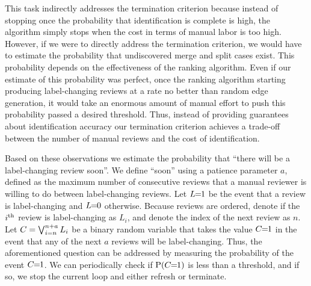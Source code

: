 This task indirectly addresses the termination criterion because instead of stopping once the probability that
  identification is complete is high, the algorithm simply stops when the cost in terms of manual labor is too
  high.
However, if we were to directly address the termination criterion, we would have to estimate the probability that
  undiscovered merge and split cases exist.
This probability depends on the effectiveness of the ranking algorithm.
Even if our estimate of this probability was perfect, once the ranking algorithm starting producing label-changing
  reviews at a rate no better than random edge generation, it would take an enormous amount of manual effort to
  push this probability passed a desired threshold.
Thus, instead of providing guarantees about identification accuracy our termination criterion achieves a
  trade-off between the number of manual reviews and the cost of identification.

Based on these observations we estimate the probability that ``there will be a label-changing review soon''.
We define ``soon'' using a patience parameter $a$, defined as the maximum number of consecutive reviews that a
  manual reviewer is willing to do between label-changing reviews.
Let $L\mkern-6mu=\mkern-6mu1$ be the event that a review is label-changing and $L\mkern-6mu=\mkern-6mu0$ otherwise.
Because reviews are ordered, denote if the $i^{\textrm{th}}$ review is label-changing as $L_i$, and denote the index of the
  next review as $n$.
Let  %
$C = \bigvee_{i=n}^{n+a} L_i$
%
be a binary random variable that takes the value $C\mkern-6mu=\mkern-6mu1$ in the event that any of the next $a$ reviews will be
  label-changing.
Thus, the aforementioned question can be addressed by measuring the probability of the event $C\mkern-6mu=\mkern-6mu1$.
We can periodically check if $\mathbin{\operatorname{P}}(C\mkern-6mu=\mkern-6mu1)$ is less than a threshold, and if so, we stop the current loop and
  either refresh or terminate.

